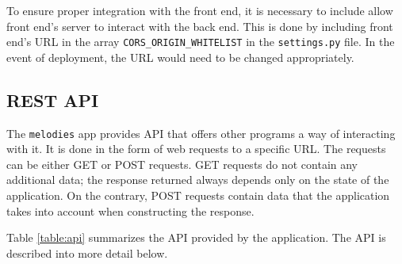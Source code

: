 To ensure proper integration with the front end, it is necessary to include allow front end's server to interact with the back end. This is done by
including front end's URL in the array \verb|CORS_ORIGIN_WHITELIST| in the \verb|settings.py| file. In the event of deployment, the URL
would need to be changed appropriately.

\subsection{REST API}
\label{section:api}

The \verb|melodies| app provides API that offers other programs a way of interacting with it. It is done in the form of web requests to a specific URL. The requests
can be either GET or POST requests. GET requests do not contain any additional data; the response returned always depends only on the state of the application. On
the contrary, POST requests contain data that the application takes into account when constructing the response.

Table \ref{table:api} summarizes the API provided by the application. The API is described into more detail below.

